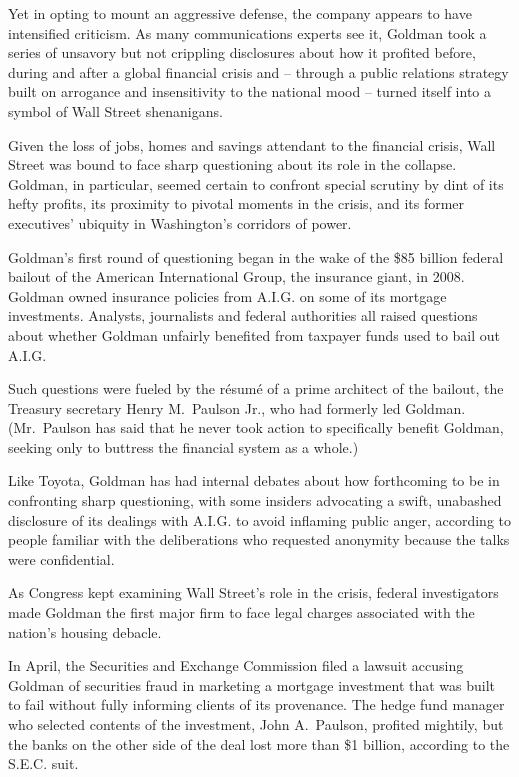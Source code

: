 ﻿\documentclass[12pt]{article}
\begin{document}
Yet in opting to mount an aggressive defense, the company appears to have intensified criticism. As
many communications experts see it, Goldman took a series of unsavory but not crippling disclosures
about how it profited before, during and after a global financial crisis and -- through a public
relations strategy built on arrogance and insensitivity to the national mood -- turned itself into a
symbol of Wall Street shenanigans.

Given the loss of jobs, homes and savings attendant to the financial crisis, Wall Street was bound
to face sharp questioning about its role in the collapse. Goldman, in particular, seemed certain to
confront special scrutiny by dint of its hefty profits, its proximity to pivotal moments in the
crisis, and its former executives' ubiquity in Washington's corridors of power.

Goldman's first round of questioning began in the wake of the \$85 billion federal bailout of the
American International Group, the insurance giant, in 2008. Goldman owned insurance policies from
A.I.G. on some of its mortgage investments. Analysts, journalists and federal authorities all raised
questions about whether Goldman unfairly benefited from taxpayer funds used to bail out A.I.G.

Such questions were fueled by the r\'esum\'e of a prime architect of the bailout, the Treasury
secretary Henry M.~Paulson Jr., who had formerly led Goldman. (Mr.~Paulson has said that he never
took action to specifically benefit Goldman, seeking only to buttress the financial system as a
whole.)

Like Toyota, Goldman has had internal debates about how forthcoming to be in confronting sharp
questioning, with some insiders advocating a swift, unabashed disclosure of its dealings with A.I.G.
to avoid inflaming public anger, according to people familiar with the deliberations who requested
anonymity because the talks were confidential.

As Congress kept examining Wall Street's role in the crisis, federal investigators made Goldman the
first major firm to face legal charges associated with the nation's housing debacle.

In April, the Securities and Exchange Commission filed a lawsuit accusing Goldman of securities
fraud in marketing a mortgage investment that was built to fail without fully informing clients of
its provenance. The hedge fund manager who selected contents of the investment, John A.~Paulson,
profited mightily, but the banks on the other side of the deal lost more than \$1 billion, according
to the S.E.C. suit.
\end{document}
